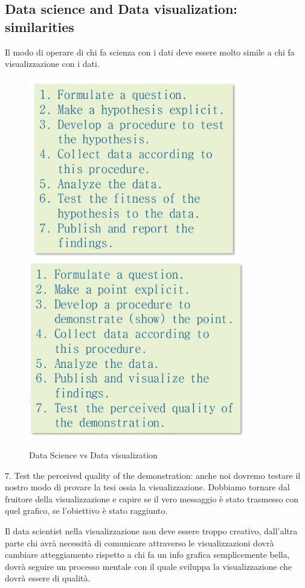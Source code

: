 \documentclass[12pt,a4paper]{report}
\begin{document}
\subsection{Data science and Data visualization: similarities}

Il modo di operare di chi fa scienza con i dati deve essere molto simile a chi fa visualizzazione con i dati. 

\begin{figure}[h]
	\centering
	\includegraphics[width=.48\textwidth]{imgs datavis/Passaggi1.png}\hfil
	\includegraphics[width=.49\textwidth]{imgs datavis/Passaggi2.png}
	
	\caption{Data Science vs Data visualization}\label{etichetta}
\end{figure}

7. Test the perceived quality of the demonstration: anche noi dovremo testare il nostro modo di provare la tesi ossia la visualizzazione. Dobbiamo tornare dal fruitore della visualizzazione e capire se il vero messaggio è stato trasmesso con quel grafico, se l'obiettivo è stato raggiunto. 

Il data scientist nella visualizzazione non deve essere troppo creativo, dall'altra parte chi avrà necessità di comunicare attraverso le visualizzazioni dovrà cambiare atteggiamento rispetto a chi fa un info grafica semplicemente bella, dovrà seguire un processo mentale con il quale sviluppa la visualizzazione che dovrà essere di qualità. 
\end{document}
